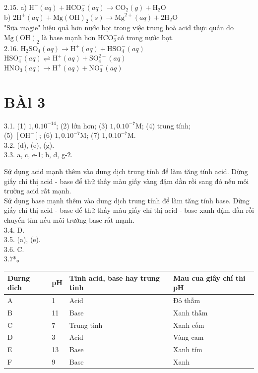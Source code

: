 \documentclass[10pt]{article}
\begin{document}
2.15. a) $\mathrm{H}^{+}(a q)+\mathrm{HCO}_{3}^{-}(a q) \rightarrow \mathrm{CO}_{2}(g)+\mathrm{H}_{2} \mathrm{O}$\\
b) $2 \mathrm{H}^{+}(a q)+\mathrm{Mg}(\mathrm{OH})_{2}(s) \rightarrow \mathrm{Mg}^{2+}(a q)+2 \mathrm{H}_{2} \mathrm{O}$\\
"Sữa magie" hiệu quả hơn nước bọt trong việc trung hoà acid thực quản do $\mathrm{Mg}(\mathrm{OH})_{2}$ là base mạnh hơn $\mathrm{HCO}_{3}^{-}$có trong nước bọt.\\
2.16. $\mathrm{H}_{2} \mathrm{SO}_{4}(a q) \rightarrow \mathrm{H}^{+}(a q)+\mathrm{HSO}_{4}^{-}(a q)$\\
$\mathrm{HSO}_{4}^{-}(a q) \rightleftharpoons \mathrm{H}^{+}(a q)+\mathrm{SO}_{4}^{2-}(a q)$\\
$\mathrm{HNO}_{3}(a q) \rightarrow \mathrm{H}^{+}(a q)+\mathrm{NO}_{3}^{-}(a q)$

\section*{BÀl 3}
3.1. (1) $1,0.10^{-14}$; (2) lớn hơn; (3) $1,0.10^{-7} \mathrm{M}$; (4) trung tính;\\
(5) $\left[\mathrm{OH}^{-}\right]$; (6) $1,0.10^{-7} \mathrm{M}$; (7) $1,0.10^{-7} \mathrm{M}$.\\
3.2. (d), (e), (g).\\
3.3. a, c, e-1; b, d, g-2.

Sử dụng acid mạnh thêm vào dung dịch trung tính để làm tăng tính acid. Dừng giấy chỉ thị acid - base để thử thấy màu giấy vàng đậm dần rồi sang đỏ nếu môi trường acid rất mạnh.\\
Sử dụng base mạnh thêm vào dung dịch trung tính để làm tăng tính base. Dừng giấy chỉ thị acid - base để thử thấy màu giấy chỉ thị acid - base xanh đậm dần rồi chuyển tím nếu môi trường base rất mạnh.\\
3.4. D.\\
3.5. (a), (e).\\
3.6. C.\\
3.7*。

\begin{center}
\begin{tabular}{|l|l|l|l|}
\hline
Durng dich & pH & Tinh acid, base hay trung tinh & Mau cua giây chí thi pH \\
\hline
A & 1 & Acid & Đỏ thẫm \\
\hline
B & 11 & Base & Xanh thẫm \\
\hline
C & 7 & Trung tinh & Xanh cốm \\
\hline
D & 3 & Acid & Vàng cam \\
\hline
E & 13 & Base & Xanh tím \\
\hline
F & 9 & Base & Xanh \\
\hline
\end{tabular}
\end{center}
\end{document}
